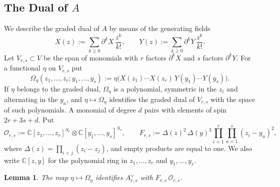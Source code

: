 \documentclass[11pt]{amsart}
\numberwithin{equation}{section}
\newtheorem{lemma}[theorem]{Lemma}
\theoremstyle{definition}
\theoremstyle{remark}
\newcommand{\C}{\mathbb{C}}
\newcommand{\dd}{\partial}
\newcommand{\cO}{\mathcal{O}}
\begin{document}
\subsection{The Dual of \texorpdfstring{$A$}{A}}
We describe the graded dual of $A$ by means of the generating fields
\begin{equation}\label{eq:XY-fields}
X(z):=\sum_{k\ge0}\dd^kX\,\frac{z^k}{k!},\qquad Y(z):=\sum_{k\ge0}\dd^kY\,\frac{z^k}{k!}.
\end{equation}
Let $V_{r,s}\subset V$ be the span of monomials with $r$ factors $\dd^kX$ and $s$ factors $\dd^kY$. For a functional $\eta$ on $V_{r,s}$ put
\begin{equation}\label{eq:Omega}
\Omega_\eta(z_1,\dots,z_r;y_1,\dots,y_s):=\eta\bigl(X(z_1)\cdots X(z_r)\,Y(y_1)\cdots Y(y_s)\bigr).
\end{equation}
If $\eta$ belongs to the graded dual, $\Omega_\eta$ is a polynomial, symmetric in the $z_i$ and alternating in the $y_a$, and $\eta\mapsto\Omega_\eta$ identifies the graded dual of $V_{r,s}$ with the space of such polynomials. A monomial of degree $d$ pairs with elements of spin $2r+3s+d$. Put
\begin{equation}\label{eq:F}
\cO_{r,s}:=\C[z_1,\dots,z_r]^{S_r}\otimes\C[y_1,\dots,y_s]^{S_s},\qquad
F_{r,s}:=\Delta(z)^2\,\Delta(y)^3\prod_{i=1}^r\prod_{a=1}^s(z_i-y_a)^2,
\end{equation}
where $\Delta(z)=\prod_{i<j}(z_i-z_j)$, and empty products are equal to one. We also write $\C[z,y]$ for the polynomial ring in $z_1,\dots,z_r$ and $y_1,\dots,y_s$.

\begin{lemma}\label{lem:dualA}
The map $\eta\mapsto\Omega_\eta$ identifies $A_{r,s}^\vee$ with $F_{r,s}\,\cO_{r,s}$.
\end{lemma}
\end{document}
